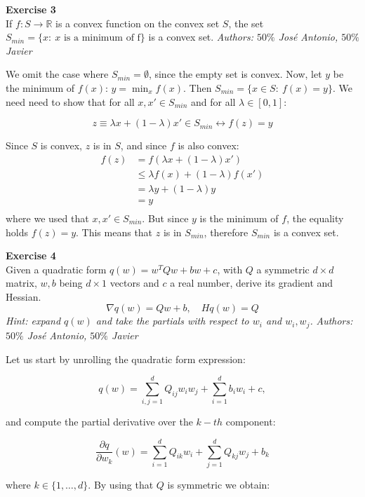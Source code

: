 \documentclass[11pt,table]{article}
\newenvironment{problem}[2][Exercise]
{ \begin{mdframed}[backgroundcolor=gray!20] \textbf{#1 #2} \\}
	{\hspace{0.0cm}\newline\newline \emph{Authors: \(50\%\) José Antonio, \(50\%\) Javier}  \end{mdframed}}
\begin{document}
\begin{problem}{3}
If \( f: S \to \mathbb{R} \) is a convex function on the convex set \( S \), the set \( S_{min} = \{x : \ x \text{ is a minimum of f} \} \) is a convex set.
\end{problem}

We omit the case where \(S_{min} = \emptyset\), since the empty set is convex. Now, let \(y\) be the minimum of \(f(x)\): \(y = \min_x f(x)\). Then \( S_{min} = \{x \in S : \ f(x) = y \} \). We need need to show that for all \(x, x' \in S_{min}\) and for all \(\lambda \in [0,1]\):

\[
	z \equiv \lambda x + (1-\lambda) x' \in S_{min} \leftrightarrow f(z) = y
\]

Since \(S\) is convex, \(z\) is in \(S\), and since \(f\) is also convex:
\begin{align*}
	f(z) & = f\left(\lambda x + (1-\lambda) x'\right) \\
	     & \leq \lambda f(x) + (1-\lambda) f(x')      \\
	     & = \lambda y + (1-\lambda) y                \\
	     & = y                                        \\
\end{align*}
where we used that \(x, x'\in S_{min}\). But since \(y\) is the minimum of \(f\), the equality holds \(f(z) = y\). This means that \(z\) is in \(S_{min}\), therefore \(S_{min}\) is a convex set.

\begin{problem}{4}
Given a quadratic form \( q(w) = w^TQw + bw + c \), with \( Q \) a symmetric \( d\times d \) matrix, \( w,b\) being \(d\times 1 \) vectors and \( c \) a real number, derive its gradient and Hessian.
\[
	\nabla q(w) = Qw + b, \quad Hq(w) = Q
\]
\emph{Hint: expand \(q(w)\) and take the partials with respect to \(w_i\) and \(w_i,w_j\).}
\end{problem}

Let us start by unrolling the quadratic form expression:

\[
	q(w) = \sum_{i,j=1}^{d} Q_{ij} w_{i}w_{j} + \sum_{i=1}^{d}b_{i}w_{i} + c,
\]

and compute the partial derivative over the \(k-th\) component:

\[
	\frac{\partial q}{\partial w_k} (w) = \sum_{i=1}^{d} Q_{ik} w_{i} + \sum_{j=1}^{d} Q_{kj} w_{j} + b_{k}
\]

where \(k \in \{1, \ldots, d\}\). By using that \(Q\) is symmetric we obtain:
\end{document}

